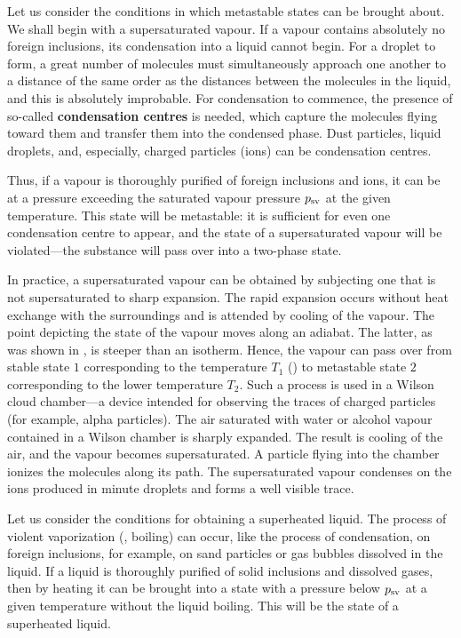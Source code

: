 Let us consider the conditions in which metastable states can be brought about. We shall begin with a supersaturated vapour. If a vapour contains absolutely no foreign inclusions, its condensation into a liquid cannot begin. For a droplet to form, a great number of molecules must simultaneously approach one another to a distance of the same order as the distances between the molecules in the liquid, and this is absolutely improbable. For condensation to commence, the presence of so-called \textbf{condensation centres} is needed, which capture the molecules flying toward them and transfer them into the condensed phase. Dust particles, liquid droplets, and, especially, charged particles (ions) can be condensation centres.

Thus, if a vapour is thoroughly purified of foreign inclusions and ions, it can be at a pressure exceeding the saturated vapour pressure $p_{\text{sv}}$ at the given temperature. This state will be metastable: it is sufficient for even one condensation centre to appear, and the state of a supersaturated vapour will be violated---the substance will pass over into a two-phase state.

In practice, a supersaturated vapour can be obtained by subjecting one that is not supersaturated to sharp expansion. The rapid expansion occurs without heat exchange with the surroundings and is attended by cooling of the vapour. The point depicting the state of the vapour moves along an adiabat. The latter, as was shown in , is steeper than an isotherm. Hence, the vapour can pass over from stable state $1$ corresponding to the temperature $T_1$ () to metastable state $2$ corresponding to the lower temperature $T_2$. Such a process is used in a Wilson cloud chamber---a device intended for observing the traces of charged particles (for example, alpha particles). The air saturated with water or alcohol vapour contained in a Wilson chamber is sharply expanded. The result is cooling of the air, and the vapour becomes supersaturated. A particle flying into the chamber ionizes the molecules along its path. The supersaturated vapour condenses on the ions produced in minute droplets and forms a well visible trace.

Let us consider the conditions for obtaining a superheated liquid. The process of violent vaporization (\ie, boiling) can occur, like the process of condensation, on foreign inclusions, for example, on sand particles or gas bubbles dissolved in the liquid. If a liquid is thoroughly purified of solid inclusions and dissolved gases, then by heating it can be brought into a state with a pressure below $p_{\text{sv}}$ at a given temperature without the liquid boiling. This will be the state of a superheated liquid.

